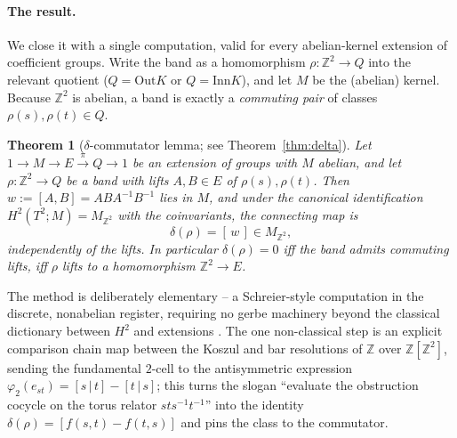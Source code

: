 \documentclass[11pt]{article}
\newtheorem{theorem}{Theorem}
\theoremstyle{definition}
\newcommand{\Z}{\mathbb{Z}}
\newcommand{\Inn}{\mathrm{Inn}}
\newcommand{\Out}{\mathrm{Out}}
\begin{document}
\paragraph{The result.} We close it with a single computation, valid for every abelian-kernel
extension of coefficient groups. Write the band as a homomorphism $\rho\colon\Z^2\to Q$ into
the relevant quotient ($Q=\Out K$ or $Q=\Inn K$), and let $M$ be the (abelian) kernel. Because
$\Z^2$ is abelian, a band is exactly a \emph{commuting pair} of classes $\rho(s),\rho(t)\in Q$.

\begin{theorem}[$\delta$-commutator lemma; see Theorem~\ref{thm:delta}]\label{thm:intro-delta}
Let $1\to M\to E\xrightarrow{\pi} Q\to 1$ be an extension of groups with $M$ abelian, and let
$\rho\colon\Z^2\to Q$ be a band with lifts $A,B\in E$ of $\rho(s),\rho(t)$. Then
$w:=[A,B]=ABA^{-1}B^{-1}$ lies in $M$, and under the canonical identification
$H^2(T^2;M)=M_{\Z^2}$ with the coinvariants, the connecting map is
\[
\delta(\rho)=[\,w\,]\in M_{\Z^2},
\]
independently of the lifts. In particular $\delta(\rho)=0$ iff the band admits commuting
lifts, iff $\rho$ lifts to a homomorphism $\Z^2\to E$.
\end{theorem}

The method is deliberately elementary -- a Schreier-style computation in the discrete,
nonabelian register, requiring no gerbe machinery beyond the classical dictionary between
$H^2$ and extensions \cite{brown,eml}. The one non-classical step is an explicit comparison
chain map between the Koszul and bar resolutions of $\Z$ over $\Z[\Z^2]$, sending the
fundamental $2$-cell to the antisymmetric expression $\varphi_2(e_{st})=[s\,|\,t]-[t\,|\,s]$;
this turns the slogan ``evaluate the obstruction cocycle on the torus relator $sts^{-1}t^{-1}$''
into the identity $\delta(\rho)=[f(s,t)-f(t,s)]$ and pins the class to the commutator.
\end{document}
